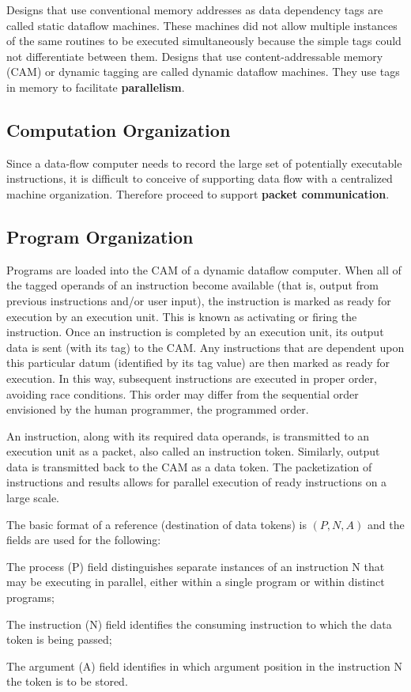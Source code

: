 \documentclass[UTF8,12pt,a4paper]{article}
\begin{document}
Designs that use conventional memory addresses as data dependency tags are called static dataflow machines.
These machines did not allow multiple instances of the same routines to be executed simultaneously
because the simple tags could not differentiate between them.
Designs that use content-addressable memory (CAM) or dynamic tagging are called dynamic dataflow machines.
They use tags in memory to facilitate \textbf{parallelism}.

\subsection{Computation Organization}
Since a data-flow computer needs to record
the large set of potentially executable instructions,
it is difficult to conceive of supporting
data flow with a centralized machine organization.
Therefore proceed to support \textbf{packet communication}.

\subsection{Program Organization}
Programs are loaded into the CAM of a dynamic dataflow computer.
When all of the tagged operands of an instruction become available (that is, output from previous instructions and/or user input),
the instruction is marked as ready for execution by an execution unit.
This is known as activating or firing the instruction.
Once an instruction is completed by an execution unit,
its output data is sent (with its tag) to the CAM.
Any instructions that are dependent upon this particular datum (identified by its tag value)
are then marked as ready for execution.
In this way, subsequent instructions are executed in proper order, avoiding race conditions.
This order may differ from the sequential order envisioned by the human programmer, the programmed order.

An instruction, along with its required data operands,
is transmitted to an execution unit as a packet, also called an instruction token.
Similarly, output data is transmitted back to the CAM as a data token.
The packetization of instructions and results allows for parallel execution of ready instructions on a large scale.

The basic format of a reference (destination of data tokens) is $(P, N, A)$
and the fields are used for the following:
\begin{compactitem}
  \item The process (P) field distinguishes separate instances
        of an instruction N that may be executing in parallel,
        either within a single program or within distinct programs;
  \item The instruction (N) field identifies the consuming instruction
        to which the data token is being passed;
  \item The argument (A) field identifies in which
        argument position in the instruction N the token is to be stored. 
\end{compactitem}
\end{document}
